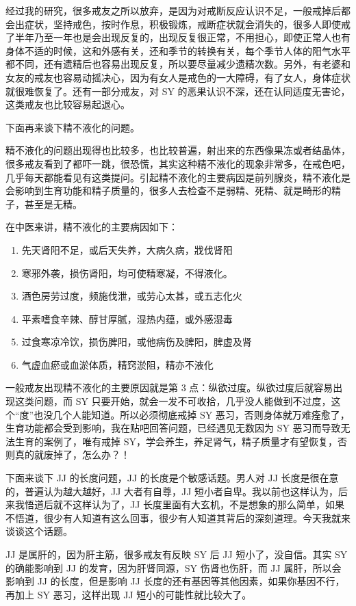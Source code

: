 \documentclass{ctexart}
\begin{document}
经过我的研究，很多戒友之所以放弃，是因为对戒断反应认识不足，一般戒掉后都会出症状，坚持戒色，按时作息，积极锻炼，戒断症状就会消失的，很多人即使戒了半年乃至一年也是会出现反复的，出现反复很正常，不用担心，即使正常人也有身体不适的时候，这和外感有关，还和季节的转换有关，每个季节人体的阳气水平都不同，还有遗精后也容易出现反复，所以要尽量减少遗精次数。另外，有老婆和女友的戒友也容易动摇决心，因为有女人是戒色的一大障碍，有了女人，身体症状就很难恢复了。还有一部分戒友，对 SY 的恶果认识不深，还在认同适度无害论，这类戒友也比较容易起退心。

下面再来谈下精不液化的问题。

精不液化的问题出现得也比较多，也比较普遍，射出来的东西像果冻或者结晶体，很多戒友看到了都吓一跳，很恐慌，其实这种精不液化的现象非常多，在戒色吧，几乎每天都能看见有这类提问。引起精不液化的主要病因是前列腺炎，精不液化是会影响到生育功能和精子质量的，很多人去检查不是弱精、死精、就是畸形的精子，甚至是无精。

在中医来讲，精不液化的主要病因如下：

\begin{enumerate}
    \item 先天肾阳不足，或后天失养，大病久病，戕伐肾阳
    \item 寒邪外袭，损伤肾阳，均可使精寒凝，不得液化。
    \item 酒色房劳过度，频施伐泄，或劳心太甚，或五志化火
    \item 平素嗜食辛辣、醇甘厚腻，湿热内蕴，或外感湿毒
    \item 过食寒凉冷饮，损伤脾阳，或他病伤及脾阳，脾虚及肾
    \item 气虚血瘀或血淤体质，精窍淤阻，精亦不液化
\end{enumerate}

一般戒友出现精不液化的主要原因就是第 3 点：纵欲过度。纵欲过度后就容易出现这类问题，而 SY 只要开始，就会一发不可收拾，几乎没人能做到不过度，这个“度”也没几个人能知道。所以必须彻底戒掉 SY 恶习，否则身体就万难痊愈了，生育功能都会受到影响，我在贴吧回答问题，已经遇见无数因为 SY 恶习而导致无法生育的案例了，唯有戒掉 SY，学会养生，养足肾气，精子质量才有望恢复，否则真的就废掉了，怎么办？！

下面来谈下 JJ 的长度问题，JJ 的长度是个敏感话题。男人对 JJ 长度是很在意的，普遍认为越大越好，JJ 大者有自尊，JJ 短小者自卑。我以前也这样认为，后来我悟道后就不这样认为了，JJ 长度里面有大玄机，不是想象的那么简单，如果不悟道，很少有人知道有这么回事，很少有人知道其背后的深刻道理。今天我就来谈谈这个话题。

JJ 是属肝的，因为肝主筋，很多戒友有反映 SY 后 JJ 短小了，没自信。其实 SY 的确能影响到 JJ 的发育，因为肝肾同源，SY 伤肾也伤肝，而 JJ 属肝，所以会影响到 JJ 的长度，但是影响 JJ 长度的还有基因等其他因素，如果你基因不行，再加上 SY 恶习，这样出现 JJ 短小的可能性就比较大了。
\end{document}
